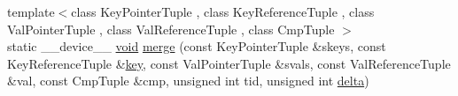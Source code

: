 \begin{DoxyCompactItemize}
\item 
{\footnotesize template$<$class Key\-Pointer\-Tuple , class Key\-Reference\-Tuple , class Val\-Pointer\-Tuple , class Val\-Reference\-Tuple , class Cmp\-Tuple $>$ }\\static \-\_\-\-\_\-device\-\_\-\-\_\- \hyperlink{legacy_8hpp_a8bb47f092d473522721002c86c13b94e}{void} \hyperlink{structcv_1_1gpu_1_1device_1_1reduce__key__val__detail_1_1For_a46df467c71f45e8bd21db6a1bc4b3a84}{merge} (const Key\-Pointer\-Tuple \&skeys, const Key\-Reference\-Tuple \&\hyperlink{core__c_8h_a68cf695b604d08c0b6f6f6bb282a6586}{key}, const Val\-Pointer\-Tuple \&svals, const Val\-Reference\-Tuple \&val, const Cmp\-Tuple \&cmp, unsigned int tid, unsigned int \hyperlink{legacy_8hpp_ac867054f00f4be8b1f3ebce6fba31982}{delta})
\end{DoxyCompactItemize}


